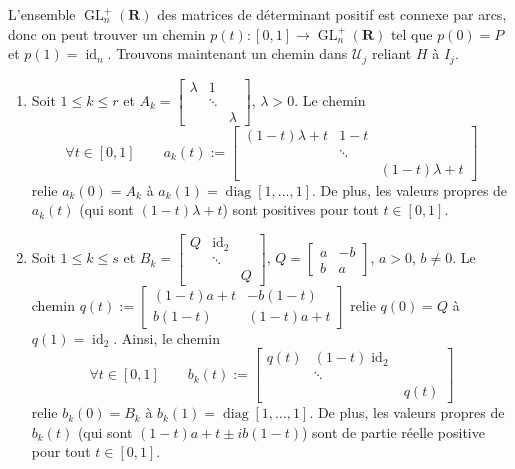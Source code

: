 \documentclass[french, 12pt]{article}
\theoremstyle{definition}
\newcommand{\Rbb}{\mathbf{R}}
\newcommand{\Ucal}{\mathcal{U}}
\newcommand{\id}{\operatorname{id}}
\newcommand{\GL}{\operatorname{GL}}
\newcommand{\diag}{\operatorname{diag}}
\begin{document}
\begin{enumerate}
        L'ensemble $\GL^+_n(\Rbb)$ des matrices de d\'eterminant positif est connexe par arcs, donc on peut trouver un chemin $p(t): [0,1] \to \GL^{+}_n(\Rbb)$ tel que $p(0) = P$ et $p(1) = \id_n$. Trouvons maintenant un chemin dans $\Ucal_j$ reliant $H$ \`a $I_j$.
        \begin{enumerate}
            \item Soit $1 \le k \le r$ et $A_k = \begin{bmatrix}
                \lambda &  1  \\
                &  \ddots \\
                & & \lambda
            \end{bmatrix}$, $\lambda > 0$. Le chemin
                $$\forall t \in [0,1] \qquad a_k(t):=  \begin{bmatrix}
                (1-t)\lambda + t & 1 - t  \\
                &  \ddots \\
                & & (1-t)\lambda + t
            \end{bmatrix}$$
        relie $a_k(0) = A_k$ \`a $a_k(1) = \diag[1,\ldots,1]$. De plus, les valeurs propres de $a_k(t)$ (qui sont $(1 - t)\lambda + t$) sont positives pour tout $t \in [0,1]$.
        
            \item Soit $1 \le k \le s$ et $B_k = \begin{bmatrix}
                Q &  \id_2  \\
                &  \ddots \\
                & & Q
            \end{bmatrix}$, $Q = \begin{bmatrix} a & -b \\
            b & a \end{bmatrix}$, $a > 0$, $b \neq 0$. Le chemin $q(t):=\begin{bmatrix}
                (1-t)a + t & -b(1-t)\\
                b(1-t) & (1-t)a + t
            \end{bmatrix}$ relie $q(0) = Q$ \`a $q(1) = \id_2$. Ainsi, le chemin
                $$\forall t \in [0,1] \qquad b_k(t):=              \begin{bmatrix}
                         q(t) & (1 - t)\id_2  \\
                         &  \ddots \\
                         & & q(t)
                    \end{bmatrix}$$
        relie $b_k(0) = B_k$ \`a $b_k(1) = \diag[1,\ldots,1]$. De plus, les valeurs propres de $b_k(t)$ (qui sont $(1 - t)a + t \pm ib(1-t)$) sont de partie r\'eelle positive pour tout $t \in [0,1]$.
        

\end{enumerate}
\end{enumerate}
\end{document}
